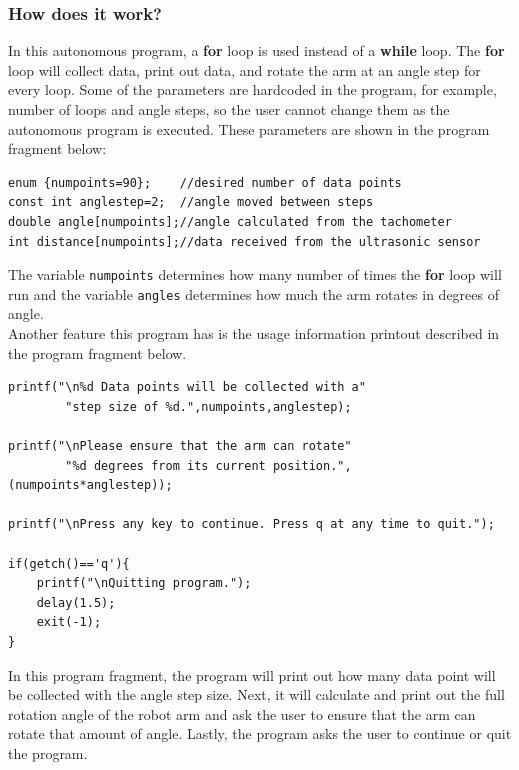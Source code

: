 \documentclass[11pt]{article}
\begin{document}
\subsubsection*{How does it work?}
In this autonomous program, a {\bf for} loop is used instead of a {\bf while} 
loop. The {\bf for} loop will collect data, print out data, and rotate the arm 
at an angle step for every loop. Some of the parameters are hardcoded in the 
program, for example, number of loops and angle steps, so the user cannot change 
them as the autonomous program is executed. These parameters are shown in the 
program fragment below:
\begin{lstlisting}
enum {numpoints=90};    //desired number of data points
const int anglestep=2;	//angle moved between steps
double angle[numpoints];//angle calculated from the tachometer
int distance[numpoints];//data received from the ultrasonic sensor
\end{lstlisting}
The variable {\tt numpoints} determines how many number of times the {\bf for} 
loop will run and the variable {\tt angles} determines how much the arm rotates 
in degrees of angle.\\

Another feature this program has is the usage information printout described in 
the program fragment below.
\begin{lstlisting}
printf("\n%d Data points will be collected with a"
        "step size of %d.",numpoints,anglestep);

printf("\nPlease ensure that the arm can rotate"
        "%d degrees from its current position.",(numpoints*anglestep));

printf("\nPress any key to continue. Press q at any time to quit.");

if(getch()=='q'){
    printf("\nQuitting program.");
    delay(1.5);
    exit(-1);
}
\end{lstlisting}
In this program fragment, the program will print out how many data point will be 
collected with the angle step size. Next, it will calculate and print out the full 
rotation angle of the robot arm and ask the user to ensure that the arm can rotate 
that amount of angle. Lastly, the program asks the user to continue or quit the 
program.
\end{document}

